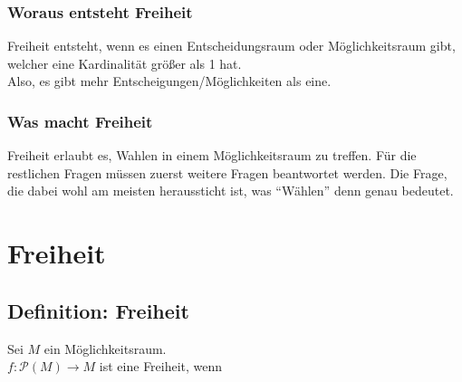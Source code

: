 \documentclass[12pt]{article}
\begin{document}
			\subsubsection{Woraus entsteht Freiheit}
				Freiheit entsteht, wenn es einen Entscheidungsraum
				oder Möglichkeitsraum gibt, welcher eine Kardinalität
				größer als 1 hat.\\
				Also, es gibt mehr Entscheigungen/Möglichkeiten als eine.
			\subsubsection{Was macht Freiheit}
				Freiheit erlaubt es, Wahlen in einem Möglichkeitsraum
				zu treffen.
			Für die restlichen Fragen müssen zuerst weitere Fragen
			beantwortet werden. Die Frage, die dabei wohl am meisten
			heraussticht ist, was ``Wählen'' denn genau bedeutet.
	\section{Freiheit}
		\subsection{Definition: Freiheit}
			Sei $M$ ein Möglichkeitsraum.\\
			$f: \mathcal{P}(M) \rightarrow M$ ist eine Freiheit, wenn
\end{document}
